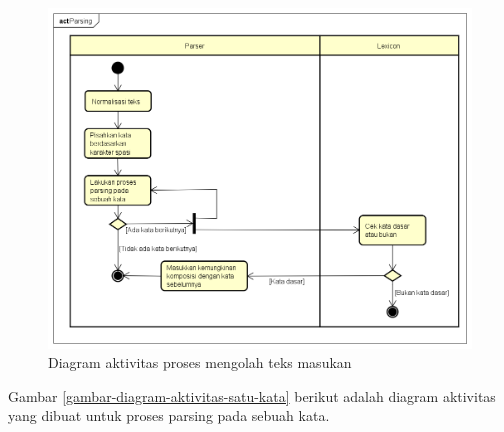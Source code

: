 \begin{figure}[H]
\centering
\includegraphics[scale=0.45]{Gambar/gambar-diagram-aktivitas-olah-masukan}
\caption{Diagram aktivitas proses mengolah teks masukan} 
\label{gambar-diagram-aktivitas-olah-masukan}
\end{figure}

Gambar \ref{gambar-diagram-aktivitas-satu-kata} berikut adalah diagram aktivitas yang dibuat untuk proses parsing pada sebuah kata.


